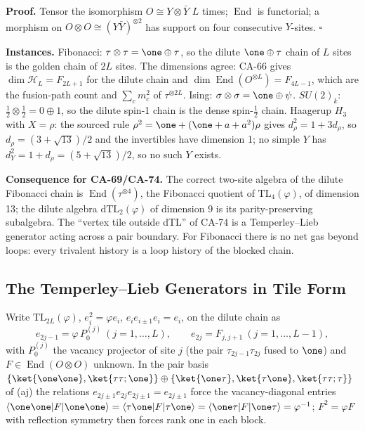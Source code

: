 \textbf{Proof.}  Tensor the isomorphism \(O\cong Y\otimes\bar Y\) \(L\) times;
\(\operatorname{End}\) is functorial; a morphism on \(O\otimes O\cong
(Y\bar Y)^{\otimes 2}\) has support on four consecutive \(Y\)-sites.  \(\square\)

\textbf{Instances.}  Fibonacci: \(\tau\otimes\tau=\one\oplus\tau\), so the
dilute \(\one\oplus\tau\) chain of \(L\) sites is the golden chain of \(2L\)
sites.  The dimensions agree: CA-66 gives \(\dim\mathcal H_L=F_{2L+1}\) for the
dilute chain and \(\dim\operatorname{End}(O^{\otimes L})=F_{4L-1}\), which are
the fusion-path count and \(\sum_c m_c^2\) of \(\tau^{\otimes 2L}\).
Ising: \(\sigma\otimes\sigma=\one\oplus\psi\).  \(SU(2)_k\):
\(\tfrac12\otimes\tfrac12=0\oplus1\), so the dilute spin-1 chain is the dense
spin-\(\tfrac12\) chain.  Haagerup \(H_3\) with \(X=\rho\): the sourced rule
\(\rho^2=\one+(\one+a+a^2)\rho\) gives \(d_\rho^2=1+3d_\rho\), so
\(d_\rho=(3+\sqrt{13})/2\) and the invertibles have dimension 1; no simple
\(Y\) has \(d_Y^2=1+d_\rho=(5+\sqrt{13})/2\), so no such \(Y\) exists.

\textbf{Consequence for CA-69/CA-74.}  The correct two-site algebra of the
dilute Fibonacci chain is \(\operatorname{End}(\tau^{\otimes4})\), the Fibonacci
quotient of \(\mathrm{TL}_4(\varphi)\), of dimension 13; the dilute algebra
\(\mathrm{dTL}_2(\varphi)\) of dimension 9 is its parity-preserving subalgebra.
The ``vertex tile outside dTL'' of CA-74 is a Temperley--Lieb generator
acting across a pair boundary.  For Fibonacci there is no net gas beyond
loops: every trivalent history is a loop history of the blocked chain.

\subsection{The Temperley--Lieb Generators in Tile Form}

Write \(\mathrm{TL}_{2L}(\varphi)\), \(e_i^2=\varphi e_i\),
\(e_ie_{i\pm1}e_i=e_i\), on the dilute chain as
\[
  e_{2j-1}=\varphi\,P_0^{(j)}\ (j=1,\dots,L),\qquad
  e_{2j}=F_{j,j+1}\ (j=1,\dots,L-1),
\]
with \(P_0^{(j)}\) the vacancy projector of site \(j\) (the pair
\(\tau_{2j-1}\tau_{2j}\) fused to \(\one\)) and \(F\in\operatorname{End}(O\otimes O)\)
unknown.  In the pair basis \(\{\ket{\one\one},\ket{\tau\tau;\one}\}\oplus
\{\ket{\one\tau},\ket{\tau\one},\ket{\tau\tau;\tau}\}\) of (aj) the relations
\(e_{2j\pm1}e_{2j}e_{2j\pm1}=e_{2j\pm1}\) force the vacancy-diagonal entries
\(\langle\one\one|F|\one\one\rangle=\langle\tau\one|F|\tau\one\rangle=\langle\one\tau|F|\one\tau\rangle=\varphi^{-1}\);
\(F^2=\varphi F\) with reflection symmetry then forces rank one in each block.

